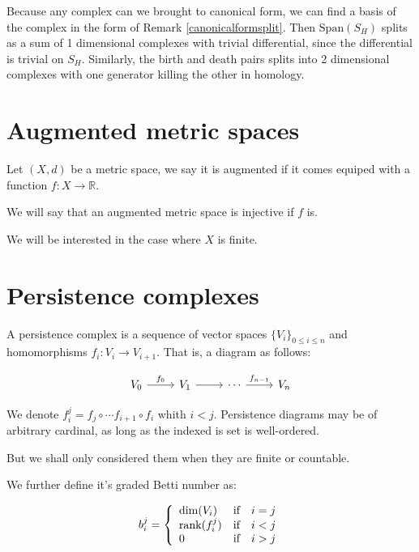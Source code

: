 \begin{prof}
Because any complex can we brought to canonical form, we can find a basis of the complex in the form of Remark \ref{canonicalformsplit}.
Then $\text{Span}(S_H)$ splits as a sum of 1 dimensional complexes with trivial differential, since the differential is trivial on $S_H$.
Similarly, the birth and death pairs splits into 2 dimensional complexes with one generator killing the other in homology.

\end{prof}

\section{Augmented metric spaces}

\begin{definition}
Let $(X,d)$ be a metric space,
we say it is augmented if it comes equiped with a function 
$f:X\to\mathbb{R}$.

\end{definition}

We will say that an augmented metric space is injective if $f$ is.

We will be interested in the case where $X$ is finite.

\section{Persistence complexes}

\begin{definition}
A persistence complex is a sequence of vector spaces 
$\{V_i\}_{0\leq i \leq n}$ and homomorphisms
 $f_i:V_i\to V_{i+1}$. That is, a diagram
as follows:


$$
\begin{tikzcd}
V_0 \arrow[r,"f_0"]
& V_1 \arrow[r]
& \cdots\arrow[r,"f_{n-1}"]
& V_n
\end{tikzcd}
$$


We denote $f_i^j
=
f_j\circ\cdots f_{i+1}\circ f_i
$ whith $i<j$.
Persistence diagrams may be of arbitrary cardinal,
as long as the indexed is set is well-ordered.

But we shall only considered them when they are finite or countable.

We further define it's graded Betti number as:

$$
b_i^j
=\left\{
\begin{array}{l c c}
\dim(V_i) & \text{if} & i=j\\
\text{rank}(f_i^j) & \text{if} & i<j\\
0 & \text{if} & i>j\\
\end{array}
\right.
$$

\end{definition}

